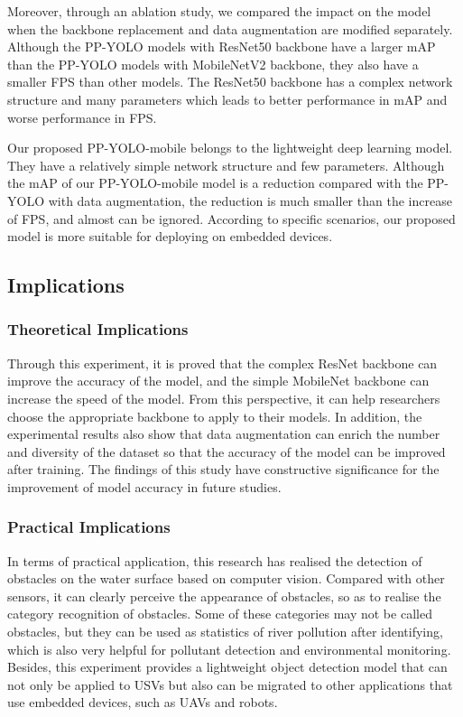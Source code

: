 \documentclass[journal,article,submit,moreauthors,pdftex]{Definitions/mdpi}
\begin{document}
Moreover, through an ablation study, we compared the impact on the model when the backbone replacement and data augmentation are modified separately.
Although the PP-YOLO models with ResNet50 backbone have a larger mAP than the PP-YOLO models with MobileNetV2 backbone, they also have a smaller FPS than other models. The ResNet50 backbone has a complex network structure and many parameters which leads to better performance in mAP and worse performance in FPS.


Our proposed PP-YOLO-mobile belongs to the lightweight deep learning model. They have a relatively simple network structure and few parameters. Although the mAP of our PP-YOLO-mobile model is a reduction compared with the PP-YOLO with data augmentation, the reduction is much smaller than the increase of FPS, and almost can be ignored. According to specific scenarios, our proposed model is more suitable for deploying on embedded devices.


\subsection{Implications}
\subsubsection{Theoretical Implications}
Through this experiment, it is proved that the complex ResNet backbone can improve the accuracy of the model, and the simple MobileNet backbone can increase the speed of the model. From this perspective, it can help researchers choose the appropriate backbone to apply to their models. In addition, the experimental results also show that data augmentation can enrich the number and diversity of the dataset so that the accuracy of the model can be improved after training. The findings of this study have constructive significance for the improvement of model accuracy in future studies.

\subsubsection{Practical Implications}
In terms of practical application, this research has realised the detection of obstacles on the water surface based on computer vision. Compared with other sensors, it can clearly perceive the appearance of obstacles, so as to realise the category recognition of obstacles.
Some of these categories may not be called obstacles, but they can be used as statistics of river pollution after identifying, which is also very helpful for pollutant detection and environmental monitoring. 
Besides, this experiment provides a lightweight object detection model that can not only be applied to USVs but also can be migrated to other applications that use embedded devices, such as UAVs and robots.
\end{document}
